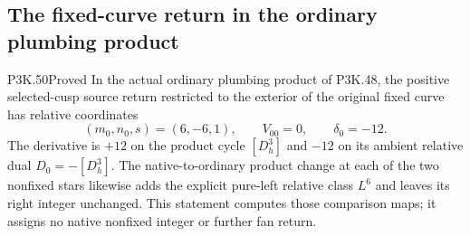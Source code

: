 \subsection{The fixed-curve return in the ordinary plumbing product}
\begin{statement}{P3K.50}{Proved}
In the actual ordinary plumbing product of P3K.48, the positive
selected-cusp source return restricted to the exterior of the
original fixed curve has relative coordinates
\[
 (m_0,n_0,s)=(6,-6,1),\qquad V_{00}=0,\qquad\delta_0=-12.
\]
The derivative is \(+12\) on the product cycle \([D^3_h]\) and
\(-12\) on its ambient relative dual \(D_0=-[D^3_h]\).
The native-to-ordinary product change at each of the two nonfixed
stars likewise adds the explicit pure-left relative class \(L^6\)
and leaves its right integer unchanged. This statement computes
those comparison maps; it assigns no native nonfixed integer or
further fan return.
\end{statement}
